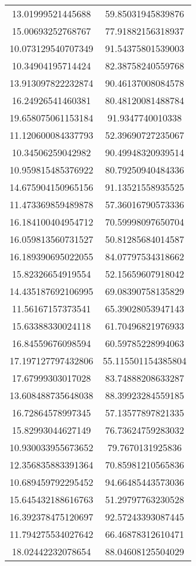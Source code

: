 \begin{table}
\begin{tabular}{cc}
13.01999521445688 & 59.85031945839876 \\
15.00693252768767 & 77.91882156318937 \\
10.073129540707349 & 91.54375801539003 \\
10.34904195714424 & 82.38758240559768 \\
13.913097822232874 & 90.46137008084578 \\
16.24926541460381 & 80.48120081488784 \\
19.658075061153184 & 91.9347740010338 \\
11.120600084337793 & 52.39690727235067 \\
10.34506259042982 & 90.49948320939514 \\
10.959815485376922 & 80.79250940484336 \\
14.675904150965156 & 91.13521558935525 \\
11.473369859489878 & 57.36016790573336 \\
16.184100404954712 & 70.59998097650704 \\
16.059813560731527 & 50.81285684014587 \\
16.189390695022055 & 84.07797534318662 \\
15.82326654919554 & 52.15659607918042 \\
14.435187692106995 & 69.08390758135829 \\
11.56167157373541 & 65.39028053947143 \\
15.63388330024118 & 61.70496821976933 \\
16.84559676098594 & 60.59785228994063 \\
17.197127797432806 & 55.115501154385804 \\
17.67999303017028 & 83.74888208633287 \\
13.608488735648038 & 88.39923284559185 \\
16.72864578997345 & 57.13577897821335 \\
15.82993044627149 & 76.73624759283032 \\
10.930033955673652 & 79.7670131925836 \\
12.356835883391364 & 70.85981210565836 \\
10.689459792295452 & 94.66485443573036 \\
15.645432188616763 & 51.29797763230528 \\
16.392378475120697 & 92.57243393087445 \\
11.794275534027642 & 66.46878312610471 \\
18.02442232078654 & 88.04608125504029 \\

\end{tabular}
\end{table}
